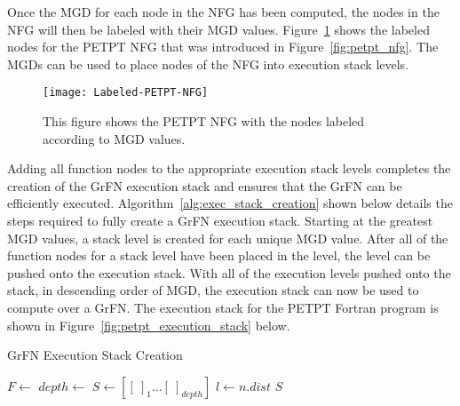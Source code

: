 Once the MGD for each node in the NFG has been computed, the nodes in the NFG will then be labeled with their MGD values.
Figure~\ref{fig:labeled_petpt_nfg} shows the labeled nodes for the PETPT NFG that was introduced in Figure~\ref{fig:petpt_nfg}.
The MGDs can be used to place nodes of the NFG into execution stack levels.

\begin{figure}[!htbp]
    \centering
    \texttt{[image: Labeled-PETPT-NFG]}%
    \caption[MGD Labeled Nodes of PETPT NFG]{This figure shows the PETPT NFG with the nodes labeled according to MGD values.} \label{fig:labeled_petpt_nfg}
\end{figure}
\FloatBarrier

Adding all function nodes to the appropriate execution stack levels completes the creation of the GrFN execution stack and ensures that the GrFN can be efficiently executed.
Algorithm~\ref{alg:exec_stack_creation} shown below details the steps required to fully create a GrFN execution stack.
Starting at the greatest MGD values, a stack level is created for each unique MGD value.
After all of the function nodes for a stack level have been placed in the level, the level can be pushed onto the execution stack.
With all of the execution levels pushed onto the stack, in descending order of MGD, the execution stack can now be used to compute over a GrFN.
The execution stack for the PETPT Fortran program is shown in Figure~\ref{fig:petpt_execution_stack} below.

\begin{algorithm}
  \caption{GrFN Execution Stack Creation}
  \label{alg:exec_stack_creation}
  \begin{algorithmic}[1]
     
      \State $F \gets$ 
      \State $depth \gets $ 
      \State $S \gets [[~]_{1} \ldots [~]_{depth}]$ 
        \State $l \gets n.dist$
        \State {} 
      \EndFor
      \State \Return $S$
      \EndProcedure
  \end{algorithmic}
\end{algorithm}

